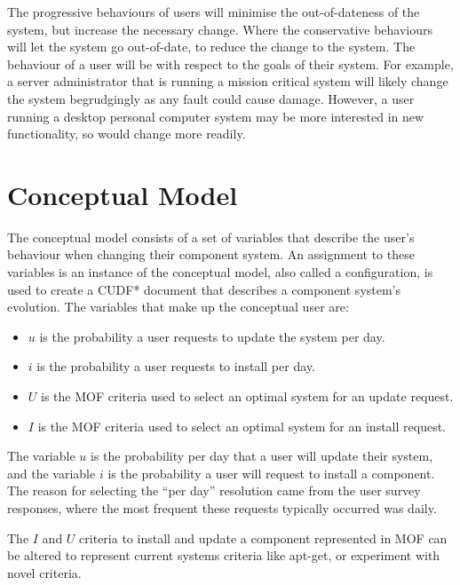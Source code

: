 The progressive behaviours of users will minimise the out-of-dateness of the system, but increase the necessary change.
Where the conservative behaviours will let the system go out-of-date, to reduce the change to the system.
The behaviour of a user will be with respect to the goals of their system.
For example, a server administrator that is running a mission critical system will likely change the system begrudgingly as any fault could cause damage.
However, a user running a desktop personal computer system may be more interested in new functionality, so would change more readily.

\section{Conceptual Model}
The conceptual model consists of a set of variables that describe the user's behaviour when changing their component system.
An assignment to these variables is an instance of the conceptual model, also called a configuration, is used to create a CUDF* document that describes a component system's evolution.
The variables that make up the conceptual user are: 
\begin{itemize}
  \item $u$ is the probability a user requests to update the system per day.
  \item $i$ is the probability a user requests to install per day.
  \item $U$ is the MOF criteria used to select an optimal system for an update request.
  \item $I$ is the MOF criteria used to select an optimal system for an install request.
\end{itemize}

The variable $u$ is the probability per day that a user will update their system, and the variable $i$ is the probability a user will request to install a component.
The reason for selecting the ``per day'' resolution came from the user survey responses, where the most frequent these requests typically occurred was daily.

The $I$ and $U$ criteria to install and update a component represented in MOF can be altered to represent current systems criteria like apt-get,
or experiment with novel criteria.


